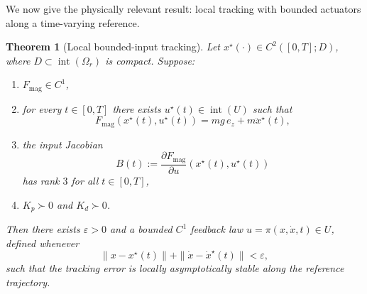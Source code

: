 \documentclass[11pt]{article}
\newtheorem{theorem}{Theorem}
\theoremstyle{definition}
\begin{document}
We now give the physically relevant result: local tracking with bounded actuators along a time-varying reference.

\begin{theorem}[Local bounded-input tracking]
Let $x^\star(\cdot)\in C^2([0,T];D)$, where $D\subset\operatorname{int}(\Omega_r)$ is compact. Suppose:
\begin{enumerate}[label=(\roman*), leftmargin=1.5em]
  \item $F_{\mathrm{mag}}\in C^1$,
  \item for every $t\in[0,T]$ there exists $u^\star(t)\in\operatorname{int}(U)$ such that
  \begin{equation}
  F_{\mathrm{mag}}(x^\star(t),u^\star(t)) = mg\,e_z + m\ddot x^\star(t),
  \label{eq:nominal_force_realization}
  \end{equation}
  \item the input Jacobian
  \begin{equation}
  B(t):=\frac{\partial F_{\mathrm{mag}}}{\partial u}(x^\star(t),u^\star(t))
  \label{eq:Bt}
  \end{equation}
  has rank $3$ for all $t\in[0,T]$,
  \item $K_p\succ0$ and $K_d\succ0$.
\end{enumerate}
Then there exists $\varepsilon>0$ and a bounded $C^1$ feedback law $u=\pi(x,\dot x,t)\in U$, defined whenever
\[
 \|x-x^\star(t)\|+\|\dot x-\dot x^\star(t)\|<\varepsilon,
\]
such that the tracking error is locally asymptotically stable along the reference trajectory.
\end{theorem}
\end{document}
